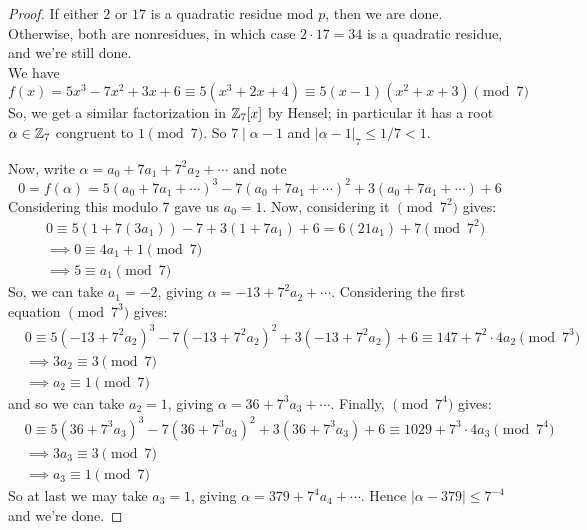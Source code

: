 \begin{proof}
	If either $2$ or $17$ is a quadratic residue mod $p$, then we are done. Otherwise, both are nonresidues, in which case $2 \cdot 17 = 34$ is a quadratic residue, and we're still done. \\
	
	We have
	\[ f(x) = 5x^3-7x^2+3x+6 \equiv 5(x^3+2x+4) \equiv 5(x-1)(x^2+x+3) \pmod{7} \]
	So, we get a similar factorization in $\mathbb{Z}_7[x]$ by Hensel; in particular it has a root $\alpha \in \mathbb{Z}_7$ congruent to $1 \pmod{7}$. So $7 \mid \alpha-1$ and $|\alpha-1|_7 \leq 1/7 < 1$.
	
	Now, write $\alpha = a_0 + 7a_1 + 7^2a_2 + \cdots$ and note
	\[ 0 = f(\alpha) = 5(a_0+7a_1+\cdots)^3-7(a_0+7a_1+\cdots)^2+3(a_0+7a_1+\cdots)+6 \]
	Considering this modulo 7 gave us $a_0 = 1$. Now, considering it $\pmod{7^2}$ gives:
	\begin{align*}
		& 0 \equiv 5(1+7(3a_1))-7+3(1+7a_1)+6 = 6(21a_1)+7 \pmod{7^2} \\
		&\implies 0 \equiv 4a_1+1 \pmod{7} \\
		&\implies 5 \equiv a_1 \pmod{7}
	\end{align*}
	So, we can take $a_1 = -2$, giving $\alpha = -13 + 7^2a_2 + \cdots$. Considering the first equation $\pmod{7^3}$ gives:
	\begin{align*}
		& 0 \equiv 5(-13+7^2a_2)^3-7(-13+7^2a_2)^2+3(-13+7^2a_2)+6 \equiv 147+7^2 \cdot 4a_2 \pmod{7^3} \\
		&\implies 3a_2 \equiv 3 \pmod{7} \\
		&\implies a_2 \equiv 1 \pmod{7}
	\end{align*}
	and so we can take $a_2 = 1$, giving $\alpha = 36 + 7^3a_3 + \cdots$. Finally, $\pmod{7^4}$ gives:
	\begin{align*}
		& 0 \equiv 5(36+7^3a_3)^3-7(36+7^3a_3)^2+3(36+7^3a_3)+6 \equiv 1029+7^3 \cdot 4a_3 \pmod{7^4} \\
		&\implies 3a_3 \equiv 3 \pmod{7} \\
		&\implies a_3 \equiv 1 \pmod{7}
	\end{align*}
	So at last we may take $a_3 = 1$, giving $\alpha = 379 + 7^4a_4 + \cdots$. Hence $|\alpha-379| \leq 7^{-4}$ and we're done.
\end{proof}
